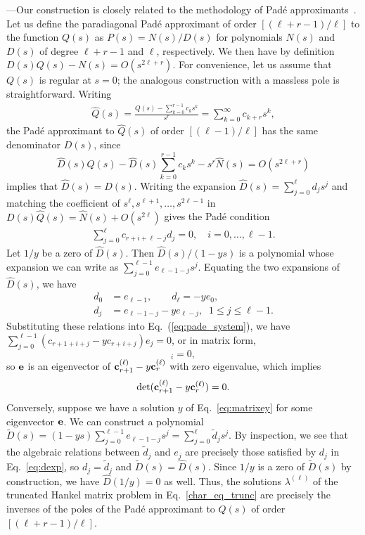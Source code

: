\documentclass[twocolumn,english,aps,prd,reprint,floatfix,notitlepage,footinbib,preprintnumbers,superscriptaddress,longbibliography]{revtex4-1}
\newcommand{\be}{\begin{equation}}
\newcommand{\ee}{\end{equation}}
\newcommand{\Eq}[1]{Eq.~(\ref{#1})}
\newcommand{\eq}[2]{\be\begin{aligned}#1 \label{#2}\end{aligned}\ee}
\newcommand{\mysec}[1]{\noindent {\bf #1.}---}
\begin{document}
\mysec{Appendix B: Pad\'e Approximant Spectroscopy}\label{pade}Our construction is closely related to the methodology of Pad\'e approximants~\cite{Nuttall,Sokolovski:2011odo,PEROTTI201895}.
Let us define the paradiagonal Pad\'e approximant of order $[(\ell+r-1)/\ell]$ to the function $Q(s)$ as   $P(s) =N(s)/D(s)$
for polynomials $N(s)$ and $D(s)$ of degree $\ell+r-1$ and $\ell$, respectively.
We then have by definition $D(s)Q(s)-N(s)=O(s^{2\ell+r})$.
For convenience, let us assume that $Q(s)$ is regular at $s=0$; the analogous construction with a massless pole is straightforward.
Writing
\eq{
\hat Q(s) = \frac{Q(s)-\sum_{k=0}^{r-1}c_{k}s^{k}}{s^r} = \sum_{k=0}^{\infty} c_{k+r}s^k,
}{}
the Pad\'e approximant to $\hat Q(s)$ of order $[(\ell-1)/\ell]$ has the same denominator $D(s)$, since \be
\hat D(s)Q(s)-\hat D(s)\sum_{k=0}^{r-1}c_{k}s^{k}-s^{r}\hat N(s)=O(s^{2\ell+r})
\ee
implies that $\hat D(s) = D(s)$.
Writing the expansion $\hat D(s) = \sum_{j=0}^{\ell}d_{j}s^{j}$ and matching the coefficient of $s^{\ell},s^{\ell+1},\ldots,s^{2\ell-1}$ in $D(s)\hat Q(s) = \hat N(s)+O(s^{2\ell})$ gives the Pad\'e condition
\eq{
\sum_{j=0}^{\ell}c_{r+i+\ell-j}d_{j}=0,\quad i=0,\ldots,\ell-1.
}{eq:pade_system}
Let $1/y$ be a zero of $\hat D(s)$.
Then $\hat D(s)/(1-ys)$ is a polynomial whose expansion we can write as $\sum_{j=0}^{\ell-1}e_{\ell-1-j}s^{j}$. Equating the two expansions of $\hat D(s)$, we have
\begin{equation}
\begin{aligned}
d_{0}&=e_{\ell-1},\qquad d_{\ell}= -ye_{0},\\
d_{j}&=e_{\ell-1-j}-ye_{\ell-j},\;\;1\leq j\leq \ell-1.
\end{aligned}\label{eq:dexp}
\end{equation}
Substituting these relations into \Eq{eq:pade_system}, we have $\sum_{j=0}^{\ell-1}\left(c_{r+1+i+j}- yc_{r+i+j}\right)e_{j}=0$,
or in matrix form,
\be
[({\bf c}_{r+1}^{(\ell)}-y {\bf c}_{r}^{(\ell)}){\bf e}]_{i}=0,\label{eq:matrixey}
\ee
so ${\bf e}$ is an eigenvector of ${\bf c}_{r+1}^{(\ell)}-y{\bf c}_{r}^{(\ell)}$
with zero eigenvalue, which implies
\be
\det({\bf c}_{r+1}^{(\ell)}-y{\bf c}_{r}^{(\ell)})=0.
\ee
Conversely, suppose we have a solution $y$ of Eq.~\eqref{eq:matrixey} for some eigenvector ${\bf e}$.  We can construct a polynomial $\tilde D(s) = (1-ys)\sum_{j=0}^{\ell-1}e_{\ell-1-j} s^j = \sum_{j=0}^\ell \tilde d_j s^j$.
By inspection, we see that the algebraic relations between $\tilde d_j$ and $e_j$ are precisely those satisfied by $d_j$ in Eq.~\eqref{eq:dexp}, so $d_j = \tilde d_j$ and $\tilde D(s) = \hat D(s)$.
Since $1/y$ is a zero of $\tilde D(s)$ by construction, we have $\hat D(1/y)=0$ as well.
Thus, the solutions
$\lambda^{(\ell)}$ of the truncated Hankel matrix problem in Eq.~\eqref{char_eq_trunc} are precisely the inverses
of the poles of the Pad\'e approximant to $Q(s)$ of order $[(\ell+r-1)/\ell]$.
\end{document}
